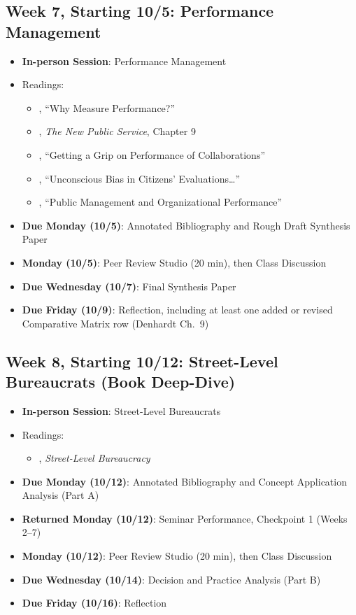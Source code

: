 \documentclass[11pt]{article}     %
\begin{document}
\subsection*{Week 7, Starting 10/5: Performance Management}
\begin{itemize}
    \item \textbf{In-person Session}: Performance Management
    \item Readings:
        \begin{itemize}
            \item \citet{Behn2003}, ``Why Measure Performance?''
            \item \citet{Denhardt2015}, \emph{The New Public Service}, Chapter 9
            \item \citet{douglas2021}, ``Getting a Grip on Performance of Collaborations''
            \item \citet{marvel2016}, ``Unconscious Bias in Citizens' Evaluations\dots''
            \item \citet{nicholson-crotty2004}, ``Public Management and Organizational Performance''
        \end{itemize}
    \item \textbf{Due Monday (10/5)}: Annotated Bibliography and Rough Draft Synthesis Paper
    \item \textbf{Monday (10/5)}: Peer Review Studio (20 min), then Class Discussion
    \item \textbf{Due Wednesday (10/7)}: Final Synthesis Paper
    \item \textbf{Due Friday (10/9)}: Reflection, including at least one added or revised Comparative Matrix row (Denhardt Ch.\ 9)
\end{itemize}

\subsection*{Week 8, Starting 10/12: Street-Level Bureaucrats (Book Deep-Dive)}
\begin{itemize}
    \item \textbf{In-person Session}: Street-Level Bureaucrats
    \item Readings:
        \begin{itemize}
            \item \citet{Lipsky2010}, \emph{Street-Level Bureaucracy}
        \end{itemize}
    \item \textbf{Due Monday (10/12)}: Annotated Bibliography and Concept Application Analysis (Part A)
    \item \textbf{Returned Monday (10/12)}: Seminar Performance, Checkpoint 1 (Weeks 2--7)
    \item \textbf{Monday (10/12)}: Peer Review Studio (20 min), then Class Discussion
    \item \textbf{Due Wednesday (10/14)}: Decision and Practice Analysis (Part B)
    \item \textbf{Due Friday (10/16)}: Reflection
\end{itemize}
\end{document}
